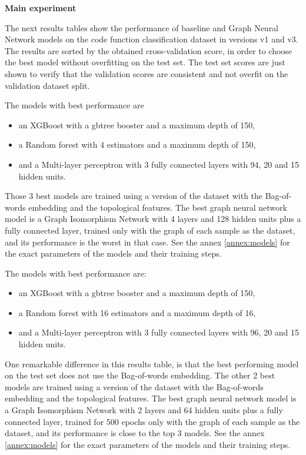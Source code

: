 \textbf{Main experiment}

The next results tables show the performance of baseline  and Graph Neural Network models on the code function classification dataset in versions v1 and v3. The results are sorted by the obtained cross-validation score, in order to choose the best model without overfitting on the test set. The test set scores are just shown to verify that the validation scores are consistent and not overfit on the validation dataset split.






The models with best performance are
\begin{itemize} 
  \item an XGBoost with a gbtree booster and a maximum depth of 150, 
  \item a Random forest with 4 estimators and a maximum depth of 150, 
  \item and a Multi-layer perceptron with 3 fully connected layers with 94, 20 and 15 hidden units. 
\end{itemize}
Those 3 best models are trained using a version of the dataset with the Bag-of-words embedding and the topological features. The best graph neural network model is a Graph Isomorphism Network with 4 layers and 128 hidden units plus  a fully connected layer, trained only with the graph of each sample as the dataset, and its performance is the worst in that case. See the annex \ref{annex:models} for the exact parameters of the models and their training steps.







The models with best performance are:
\begin{itemize} 
  \item an XGBoost with a gbtree booster and a maximum depth of 150, 
  \item a Random forest with 16 estimators and a maximum depth of 16, 
  \item and a Multi-layer perceptron with 3 fully connected layers with 96, 20 and 15 hidden units. 
\end{itemize} 
One remarkable difference in this results table, is that the best performing model on the test set does not use the Bag-of-words embedding. The other 2 best models are trained using a version of the dataset with the Bag-of-words embedding and the topological features. The best graph neural network model is a Graph Isomorphism Network with 2 layers and 64 hidden units plus  a fully connected layer, trained for 500 epochs only with the graph of each sample as the dataset, and its performance is close to the top 3 models. See the annex \ref{annex:models} for the exact parameters of the models and their training steps.



